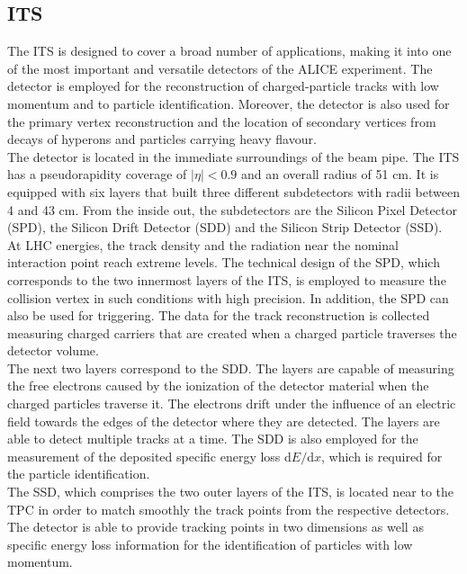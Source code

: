 \documentclass[12pt,a4paper]{report}
\begin{document}
\subsection{ITS}
The ITS is designed to cover a broad number of applications, making it into one of the most important and versatile detectors of the ALICE experiment. The detector is employed for the reconstruction of charged-particle tracks with low momentum and to particle identification. Moreover, the detector is also used for the primary vertex reconstruction and the location of secondary vertices from decays of hyperons and particles carrying heavy flavour. \\
The detector is located in the immediate surroundings of the beam pipe. The ITS has a pseudorapidity coverage of $|\eta| < 0.9 $ and an overall radius of 51 cm. It is equipped with six layers that built three different subdetectors with radii between 4 and 43 cm. From the inside out, the subdetectors are the Silicon Pixel Detector (SPD), the Silicon Drift Detector (SDD) and the Silicon Strip Detector (SSD).  \\
At LHC energies, the track density and the radiation near the nominal interaction point reach extreme levels. The technical design of the SPD, which corresponds to the two innermost layers of the ITS, is employed to measure the collision vertex in such conditions with high precision. In addition, the SPD can also be used for triggering. The data for the track reconstruction is collected measuring charged carriers that are created when a charged particle traverses the detector volume. \\
The next two layers correspond to the SDD. The layers are capable of measuring the free electrons caused by the ionization of the detector material when the charged particles traverse it. The electrons drift under the influence of an electric field towards the edges of the detector where they are detected. The layers are able to detect multiple tracks at a time. The SDD is also employed for the measurement of the deposited specific energy loss d$E/$d$x$, which is required for the particle identification.\\
The SSD, which comprises the two outer layers of the ITS, is located near to the TPC in order to match smoothly the track points from the respective detectors. The detector is able to provide tracking points in two dimensions as well as specific energy loss information for the identification of particles with low momentum.
\end{document}
